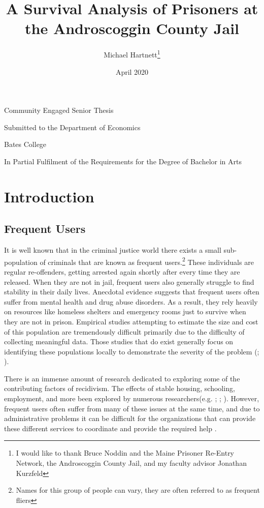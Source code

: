 \documentclass{article}
\begin{document}
\title{A Survival Analysis of Prisoners at the Androscoggin County Jail}
\author{Michael Hartnett\thanks{I would like to thank Bruce Noddin and the Maine Prisoner Re-Entry Network, the Androscoggin County Jail, and my faculty advisor Jonathan Kurzfeld}}
\date{April 2020}

\maketitle

\vspace{2in}
\begin{center}
Community Engaged Senior Thesis

Submitted to the Department of Economics

Bates College

In Partial Fulfilment of the Requirements for the Degree of Bachelor in Arts 
\end{center}

\thispagestyle{empty}

\newpage
\setcounter{page}{1}

\section{Introduction}
\subsection{Frequent Users}
It is well known that in the criminal justice world there exists a small sub-population of criminals that are known as frequent users.\footnote{Names for this group of people can vary, they are often referred to as frequent fliers} These individuals are regular re-offenders, getting arrested again shortly after every time they are released. When they are not in jail, frequent users also generally struggle to find stability in their daily lives. Anecdotal evidence suggests that frequent users often suffer from mental health and drug abuse disorders. As a result, they rely heavily on resources like homeless shelters and emergency rooms just to survive when they are not in prison. Empirical studies attempting to estimate the size and cost of this population are tremendously difficult primarily due to the difficulty of collecting meaningful data. Those studies that do exist generally focus on identifying these populations locally to demonstrate the severity of the problem (\cite{atkins}; \cite{torrey}). 

There is an immense amount of research dedicated to exploring some of the contributing factors of recidivism. The effects of stable housing, schooling, employment, and more been explored by numerous researchers(e.g. \cite{lee}; \cite{cook}; \cite{kim}). However, frequent users often suffer from many of these issues at the same time, and due to administrative problems it can be difficult for the organizations that can provide these different services to coordinate and provide the required help \parencite{stevenson}. 
\end{document}
